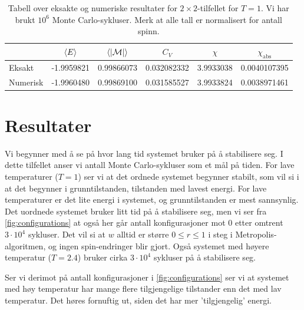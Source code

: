 \documentclass[11pt]{article}
\newcommand{\abs}[1]{|#1|}
\begin{document}
\begin{table}
\centering
\caption{Tabell over eksakte og numeriske resultater for $2\times
  2$-tilfellet for $T=1$. Vi har brukt $10^6$ Monte Carlo-sykluser. Merk at
alle tall er normalisert for antall spinn.}
\label{tab:2x2-eksakt-num}
\vspace{0.5cm}
\begin{tabular}{l|ccccc}
 & $\langle E \rangle$ & $\mean{ \abs{\mathcal{M} } }$ & $C_V$ & $\chi$ & $\chi_\text{abs}$ \\
\hline
Eksakt & -1.9959821 & 0.99866073 & 0.032082332 & 3.9933038 & 0.0040107395 \\
Numerisk & -1.9960480 & 0.99869100 & 0.031585527 & 3.9933824 & 0.0038971461 
\end{tabular}

\end{table}




\section{Resultater}

Vi begynner med å se på hvor lang tid systemet bruker på å stabilisere seg. I dette tilfellet
anser vi antall Monte Carlo-sykluser som et mål på tiden. For lave temperaturer ($T = 1$) ser vi at det
ordnede systemet begynner stabilt, som vil si i at det begynner i grunntilstanden, tilstanden med lavest energi. For lave temperaturer er det lite energi i systemet, og grunntilstanden er mest sannsynlig. Det uordnede
systemet bruker litt tid på å stabilisere seg, men vi ser fra \ref{fig:configurations} at også her går
antall konfigurasjoner mot 0 etter omtrent $3 \cdot 10^4$ sykluser. Det vil si at $w$ alltid er større $0\leq r\leq 1$ i steg \label{steg6} i Metropolis-algoritmen, og ingen spin-endringer blir gjort. Også systemet med høyere
temperatur ($T=2.4$) bruker cirka $3 \cdot 10^4$ sykluser på å stabilisere seg.

Ser vi derimot på antall konfigurasjoner i \ref{fig:configurations} ser vi at systemet med høy temperatur
har mange flere tilgjengelige tilstander enn det med lav temperatur. Det høres fornuftig ut, siden det har mer
'tilgjengelig' energi.
\end{document}
